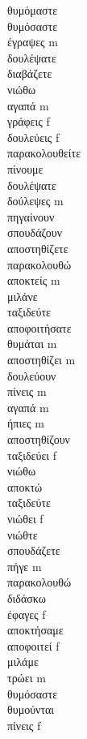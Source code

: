 θυμόμαστε  \\ 
θυμόσαστε  \\ 
έγραψες m \\ 
δουλέψατε  \\ 
διαβάζετε  \\ 
νιώθω  \\ 
αγαπά m \\ 
γράφεις f \\ 
δουλεύεις f \\ 
παρακολουθείτε  \\ 
πίνουμε  \\ 
δουλέψατε  \\ 
δούλεψες m \\ 
πηγαίνουν  \\ 
σπουδάζουν  \\ 
αποστηθίζετε  \\ 
παρακολουθώ  \\ 
αποκτείς m \\ 
μιλάνε  \\ 
ταξιδεύτε  \\ 
αποφοιτήσατε  \\ 
θυμάται m \\ 
αποστηθίζει m \\ 
δουλεύουν  \\ 
πίνεις m \\ 
αγαπά m \\ 
ήπιες m \\ 
αποστηθίζουν  \\ 
ταξιδεύει f \\ 
νιώθω  \\ 
αποκτώ  \\ 
ταξιδεύτε  \\ 
νιώθει f \\ 
νιώθτε  \\ 
σπουδάζετε  \\ 
πήγε m \\ 
παρακολουθώ  \\ 
διδάσκω  \\ 
έφαγες f \\ 
αποκτήσαμε  \\ 
αποφοιτεί f \\ 
μιλάμε  \\ 
τρώει m \\ 
θυμόσαστε  \\ 
θυμούνται  \\ 
πίνεις f \\ 
